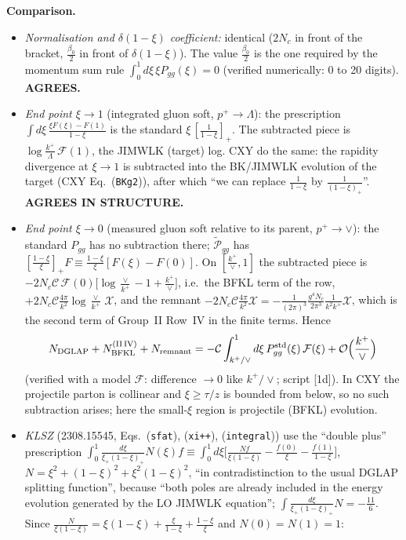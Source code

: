 \noindent\textbf{Comparison.}
\begin{itemize}
\item \emph{Normalisation and $\delta(1-\xi)$ coefficient:} identical ($2N_{c}$ in front of the bracket, $\frac{\beta_{0}}{2}$ in front of $\delta(1-\xi)$). The value $\frac{\beta_{0}}{2}$ is the one required by the momentum sum rule $\int_{0}^{1}d\xi\,\xi P_{gg}(\xi)=0$ (verified numerically: $0$ to 20 digits). \textbf{AGREES.}
\item \emph{End point $\xi\to1$} (integrated gluon soft, $p^{+}\to\Lambda$): the prescription $\int d\xi\,\frac{\xi F(\xi)-F(1)}{1-\xi}$ is the standard $\xi\,[\frac{1}{1-\xi}]_{+}$. The subtracted piece is $\log\frac{k^{+}}{\Lambda}\,\mathcal{F}(1)$, the JIMWLK (target) log. CXY do the same: the rapidity divergence at $\xi\to1$ is subtracted into the BK/JIMWLK evolution of the target (CXY Eq.~(\texttt{BKg2})), after which ``we can replace $\frac{1}{1-\xi}$ by $\frac{1}{(1-\xi)_{+}}$''. \textbf{AGREES IN STRUCTURE.}
\item \emph{End point $\xi\to0$} (measured gluon soft relative to its parent, $p^{+}\to\vee$): the standard $P_{gg}$ has no subtraction there; $\widetilde{\mathcal P}_{gg}$ has $[\frac{1-\xi}{\xi}]_{+}F\equiv\frac{1-\xi}{\xi}[F(\xi)-F(0)]$. On $[\frac{k^{+}}{\vee},1]$ the subtracted piece is $-2N_{c}\mathcal{C}\,\mathcal{F}(0)\big[\log\frac{\vee}{k^{+}}-1+\frac{k^{+}}{\vee}\big]$, i.e.\ the BFKL term of the row, $+2N_{c}\mathcal{C}\frac{4\pi}{k^{2}}\log\frac{\vee}{k^{+}}\,\mathcal{X}$, and the remnant $-2N_{c}\mathcal{C}\frac{4\pi}{k^{2}}\mathcal{X}=-\frac{1}{(2\pi)^{3}}\frac{g^{4}N_{c}}{2\pi^{3}}\frac{1}{k^{2}k^{+}}\mathcal{X}$, which is the second term of Group~II Row~IV in the finite terms. Hence
\begin{equation}
N_{\rm DGLAP}+N_{\rm BFKL}^{\rm (II\,IV)}+N_{\rm remnant}=-\mathcal{C}\int_{k^{+}/\vee}^{1}d\xi\,P_{gg}^{\rm std}(\xi)\,\mathcal{F}(\xi)+{\cal O}\Big(\frac{k^{+}}{\vee}\Big)
\end{equation}
(verified with a model $\mathcal{F}$: difference $\to0$ like $k^{+}/\vee$; script [1d]). In CXY the projectile parton is collinear and $\xi\ge\tau/z$ is bounded from below, so no such subtraction arises; here the small-$\xi$ region is projectile (BFKL) evolution.
\item \emph{KLSZ} (2308.15545, Eqs.~(\texttt{sfat}), (\texttt{xi++}), (\texttt{integral})) use the ``double plus'' prescription $\int_{0}^{1}\frac{d\xi}{\xi_{+}(1-\xi)_{+}}N(\xi)f\equiv\int_{0}^{1}d\xi\big[\frac{N f}{\xi(1-\xi)}-\frac{f(0)}{\xi}-\frac{f(1)}{1-\xi}\big]$, $N=\xi^{2}+(1-\xi)^{2}+\xi^{2}(1-\xi)^{2}$, ``in contradistinction to the usual DGLAP splitting function'', because ``both poles are already included in the energy evolution generated by the LO JIMWLK equation''; $\int\frac{d\xi}{\xi_{+}(1-\xi)_{+}}N=-\frac{11}{6}$. Since $\frac{N}{\xi(1-\xi)}=\xi(1-\xi)+\frac{\xi}{1-\xi}+\frac{1-\xi}{\xi}$ and $N(0)=N(1)=1$:

\end{itemize}
